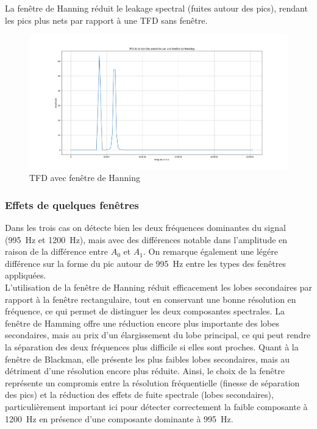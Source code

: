 La fenêtre de Hanning réduit le leakage spectral (fuites autour des pics), rendant les pics plus nets par rapport à une TFD sans fenêtre.\\

\begin{figure}[h!]
    \centering
    \includegraphics[width=18cm]{screenshots/TFD_hanning_signal.png}
    \caption{TFD avec fenêtre de Hanning}
\end{figure}

\subsubsection{Effets de quelques fenêtres}

Dans les trois cas on détecte bien les deux fréquences dominantes du signal (995~Hz et 1200~Hz), mais avec des différences notable dans l'amplitude en raison de la différence entre $A_0$ et $A_1$. On remarque également une légére différence sur la forme du pic autour de 995~Hz entre les types des fenêtres appliquées.\\

L'utilisation de la fenêtre de Hanning réduit efficacement les lobes secondaires par rapport à la fenêtre rectangulaire, tout en conservant une bonne résolution en fréquence, ce qui permet de distinguer les deux composantes spectrales. La fenêtre de Hamming offre une réduction encore plus importante des lobes secondaires, mais au prix d’un élargissement du lobe principal, ce qui peut rendre la séparation des deux fréquences plus difficile si elles sont proches. Quant à la fenêtre de Blackman, elle présente les plus faibles lobes secondaires, mais au détriment d’une résolution encore plus réduite. Ainsi, le choix de la fenêtre représente un compromis entre la résolution fréquentielle (finesse de séparation des pics) et la réduction des effets de fuite spectrale (lobes secondaires), particulièrement important ici pour détecter correctement la faible composante à 1200~Hz en présence d’une composante dominante à 995~Hz.

